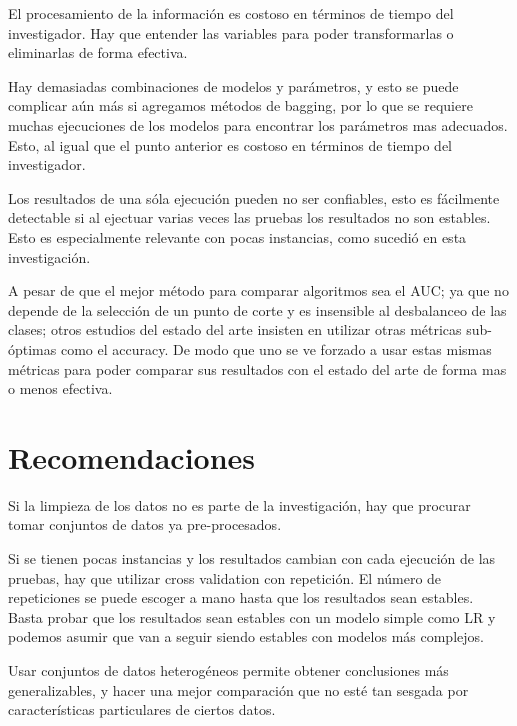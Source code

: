 El procesamiento de la información es costoso en términos de tiempo del investigador. Hay que entender las variables para poder transformarlas o eliminarlas de forma efectiva.

Hay demasiadas combinaciones de modelos y parámetros, y esto se puede complicar aún más si agregamos métodos de bagging, por lo que se requiere muchas ejecuciones de los modelos para encontrar los parámetros mas adecuados. Esto, al igual que el punto anterior es costoso en términos de tiempo del investigador.

Los resultados de una sóla ejecución pueden no ser confiables, esto es fácilmente detectable si al ejectuar varias veces las pruebas los resultados no son estables. Esto es especialmente relevante con pocas instancias, como sucedió en esta investigación.

A pesar de que el mejor método para comparar algoritmos sea el AUC; ya que no depende de la selección de un punto de corte y es insensible al desbalanceo de las clases; otros estudios del estado del arte insisten en utilizar otras métricas sub-óptimas como el accuracy. De modo que uno se ve forzado a usar estas mismas métricas para poder comparar sus resultados con el estado del arte de forma mas o menos efectiva.


\section{Recomendaciones}

Si la limpieza de los datos no es parte de la investigación, hay que procurar tomar conjuntos de datos ya pre-procesados.

Si se tienen pocas instancias y los resultados cambian con cada ejecución de las pruebas, hay que utilizar cross validation con repetición. El número de repeticiones se puede escoger a mano hasta que los resultados sean estables. Basta probar que los resultados sean estables con un modelo simple como \ac{LR} y podemos asumir que van a seguir siendo estables con modelos más complejos.

Usar conjuntos de datos heterogéneos permite obtener conclusiones más generalizables, y hacer una mejor comparación que no esté tan sesgada por características particulares de ciertos datos.

